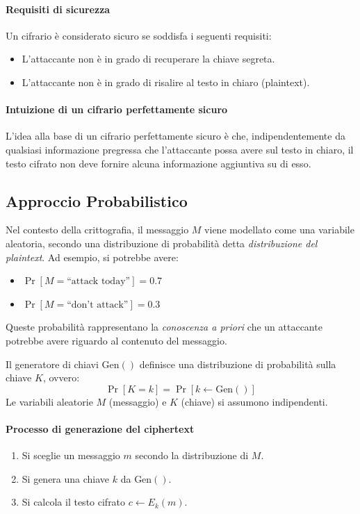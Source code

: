 \documentclass{report}
\begin{document}
            \paragraph{Requisiti di sicurezza}
                Un cifrario è considerato sicuro se soddisfa i seguenti requisiti:
            \begin{itemize}
                \item L'attaccante non è in grado di recuperare la chiave segreta.
                \item L'attaccante non è in grado di risalire al testo in chiaro (plaintext).
                \end{itemize}

            \paragraph{Intuizione di un cifrario perfettamente sicuro}
                L'idea alla base di un cifrario perfettamente sicuro è che, indipendentemente da qualsiasi informazione pregressa che l'attaccante possa avere sul testo in chiaro, il testo cifrato non deve fornire alcuna informazione aggiuntiva su di esso.
  \subsection{Approccio Probabilistico}
   Nel contesto della crittografia, il messaggio $M$ viene modellato come una variabile aleatoria, secondo una distribuzione di probabilità detta \textit{distribuzione del plaintext}. Ad esempio, si potrebbe avere:

  \begin{itemize}
      \item $\Pr[M = \text{``attack today''}] = 0.7$
      \item $\Pr[M = \text{``don't attack''}] = 0.3$
  \end{itemize}
  
  Queste probabilità rappresentano la \textit{conoscenza a priori} che un attaccante potrebbe avere riguardo al contenuto del messaggio.
  
  Il generatore di chiavi $\text{Gen}()$ definisce una distribuzione di probabilità sulla chiave $K$, ovvero:
  \[
  \Pr[K = k] = \Pr[k \leftarrow \text{Gen}()]
  \]
  Le variabili aleatorie $M$ (messaggio) e $K$ (chiave) si assumono indipendenti.
  
  \paragraph{Processo di generazione del ciphertext}
  \begin{enumerate}
      \item Si sceglie un messaggio $m$ secondo la distribuzione di $M$.
      \item Si genera una chiave $k$ da $\text{Gen}()$.
      \item Si calcola il testo cifrato $c \leftarrow E_k(m)$.
  \end{enumerate}
  
\end{document}
